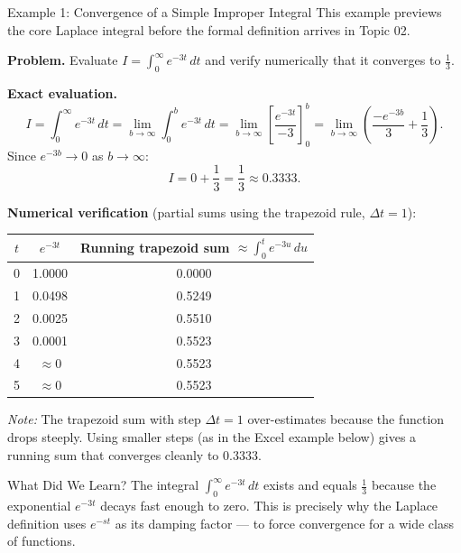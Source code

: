\documentclass[12pt,a4paper]{article}
\begin{document}
\begin{infobox}{Example 1: Convergence of a Simple Improper Integral}
This example previews the core Laplace integral before the formal definition
arrives in Topic 02.

\medskip
\textbf{Problem.} Evaluate $\displaystyle I = \int_0^\infty e^{-3t}\,dt$ and
verify numerically that it converges to $\tfrac{1}{3}$.

\medskip
\textbf{Exact evaluation.}
\[
  I = \int_0^\infty e^{-3t}\,dt
    = \lim_{b\to\infty} \int_0^b e^{-3t}\,dt
    = \lim_{b\to\infty} \left[\frac{e^{-3t}}{-3}\right]_0^b
    = \lim_{b\to\infty} \left(\frac{-e^{-3b}}{3} + \frac{1}{3}\right).
\]
Since $e^{-3b} \to 0$ as $b \to \infty$:
\[
  I = 0 + \frac{1}{3} = \frac{1}{3} \approx 0.3333.
\]

\medskip
\textbf{Numerical verification} (partial sums using the trapezoid rule,
$\Delta t = 1$):

\medskip
\begin{center}
\begin{tabular}{@{}ccc@{}}
\toprule
$t$ & $e^{-3t}$ & Running trapezoid sum $\approx \int_0^t e^{-3u}\,du$ \\
\midrule
0   & 1.0000  & 0.0000 \\
1   & 0.0498  & 0.5249 \\
2   & 0.0025  & 0.5510 \\
3   & 0.0001  & 0.5523 \\
4   & $\approx 0$ & 0.5523 \\
5   & $\approx 0$ & 0.5523 \\
\bottomrule
\end{tabular}
\end{center}

\smallskip
\noindent\textit{Note:} The trapezoid sum with step $\Delta t=1$ over-estimates
because the function drops steeply.  Using smaller steps (as in the Excel
example below) gives a running sum that converges cleanly to $0.3333$.

\end{infobox}
\begin{learnbox}{What Did We Learn?}
The integral $\int_0^\infty e^{-3t}\,dt$ exists and equals $\frac{1}{3}$
because the exponential $e^{-3t}$ decays fast enough to zero.  This is
precisely why the Laplace definition uses $e^{-st}$ as its damping
factor --- to force convergence for a wide class of functions.
\end{learnbox}

\medskip
\end{document}
